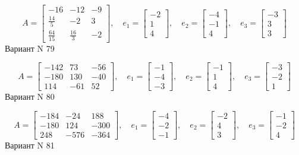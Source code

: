 \documentclass[11pt]{report}
\begin{document}
$$A = \left[\begin{matrix}-16 & -12 & -9\\\frac{14}{5} & -2 & 3\\\frac{64}{15} & \frac{16}{3} & -2\end{matrix}\right],\quad e_1 = \left[\begin{matrix}-2\\1\\4\end{matrix}\right],\quad e_2 = \left[\begin{matrix}-4\\-1\\4\end{matrix}\right],\quad e_3 = \left[\begin{matrix}-3\\3\\3\end{matrix}\right]$$Вариант N 79

$$A = \left[\begin{matrix}-142 & 73 & -56\\-180 & 130 & -40\\114 & -61 & 52\end{matrix}\right],\quad e_1 = \left[\begin{matrix}-1\\-4\\-3\end{matrix}\right],\quad e_2 = \left[\begin{matrix}-1\\1\\4\end{matrix}\right],\quad e_3 = \left[\begin{matrix}-3\\-2\\1\end{matrix}\right]$$Вариант N 80

$$A = \left[\begin{matrix}-184 & -24 & 188\\-180 & 124 & -300\\248 & -576 & -364\end{matrix}\right],\quad e_1 = \left[\begin{matrix}-4\\-2\\-1\end{matrix}\right],\quad e_2 = \left[\begin{matrix}-2\\4\\3\end{matrix}\right],\quad e_3 = \left[\begin{matrix}-1\\-2\\4\end{matrix}\right]$$Вариант N 81
\end{document}
